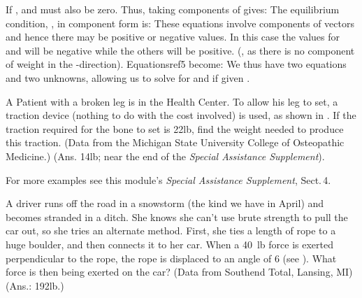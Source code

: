 {
If ,  and  must also be zero.
Thus, taking components of  gives:
%
%
%
The equilibrium condition, , in component form is:
%
%
%
These equations involve components of vectors and hence
there may be positive or negative values.
In this case the values for  and  will be negative while the
others will be positive.
(, as there is no component of weight in the -direction).
Equationsref{5} become:
%
%
%
We thus have two equations and two unknowns, allowing us to solve for 
and  if given .



\tryit A Patient with a broken leg is in the Health Center.
To allow his leg to set, a  traction device (nothing to do with the
cost involved) is used, as shown in .
If the traction required for the bone to set is 22\unit{lb}, find the weight
needed to produce this traction.
(Data from the Michigan State University College of Osteopathic Medicine.)
(Ans. 14\unit{lb};  near the end of the \textit{Special Assistance
Supplement}).

\tryit For more examples see this module's \textit{Special Assistance
Supplement}, Sect.\,4.



\tryit A driver runs off the road in a snowstorm (the kind we have
in April) and becomes stranded in a ditch.
She knows she can't use brute strength to pull the car out, so she tries an
alternate method.
First, she ties a length of rope to a huge boulder, and then connects it to
her car.
When a 40~lb force is exerted perpendicular to the rope, the rope is
displaced to an angle of {6\degrees} (see ).
What force is then being exerted on the car?
(Data from Southend Total, Lansing, MI)
(Ans.: 192\unit{lb}.)
}%
